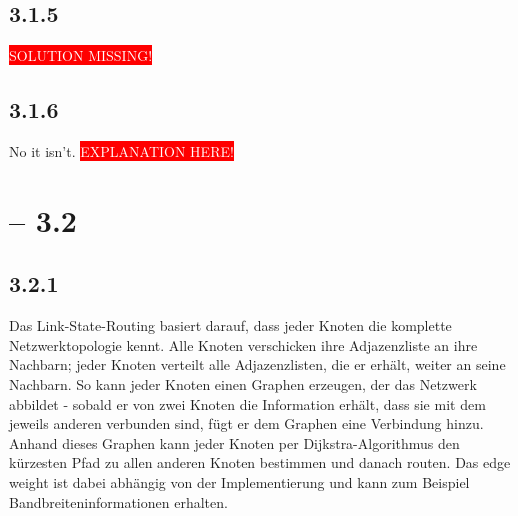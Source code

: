 \documentclass[a4paper,
			llpt,
			solution,
			accentcolor=tud2d,
			colorbacktitle
			]
			{tudexercise}
\newcommand{\8}{$\infty$}
\begin{document}
\subsection{3.1.5}
\colorbox{red}{\textcolor{white}{SOLUTION MISSING!}}
\subsection{3.1.6}
No it isn't. \colorbox{red}{\textcolor{white}{EXPLANATION HERE!}}
\clearpage
\section{ -- 3.2}
\subsection{3.2.1}
Das Link-State-Routing basiert darauf, dass jeder Knoten die komplette Netzwerktopologie kennt. Alle Knoten verschicken ihre Adjazenzliste an ihre Nachbarn; jeder Knoten verteilt alle Adjazenzlisten, die er erhält, weiter an seine Nachbarn. So kann jeder Knoten einen Graphen erzeugen, der das Netzwerk abbildet - sobald er von zwei Knoten die Information erhält, dass sie mit dem jeweils anderen verbunden sind, fügt er dem Graphen eine Verbindung hinzu. Anhand dieses Graphen kann jeder Knoten per Dijkstra-Algorithmus den kürzesten Pfad zu allen anderen Knoten bestimmen und danach routen. Das edge weight ist dabei abhängig von der Implementierung und kann zum Beispiel Bandbreiteninformationen erhalten.
\end{document}
